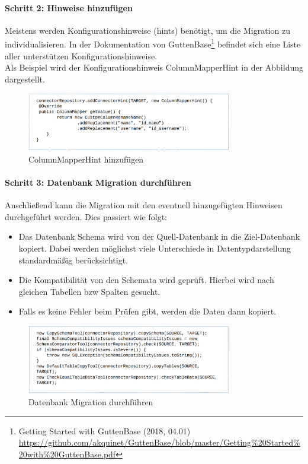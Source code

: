\paragraph*{Schritt 2: Hinweise hinzufügen}
Meistens werden Konfigurationshinweise (hints) benötigt, um die Migration zu individualisieren. In der Dokumentation von GuttenBase\footnote{Getting Started with GuttenBase (2018, 04.01) \\ \url{https://github.com/akquinet/GuttenBase/blob/master/Getting\%20Started\%20with\%20GuttenBase.pdf}} befindet sich eine Liste aller unterstützen Konfigurationshinweise. \\
Als Beispiel wird der Konfigurationshinweis ColumnMapperHint in der Abbildung dargestellt.
\begin{figure}[H]
	\centering
	\includegraphics[width=0.8\textwidth]{images/gb/rename}
	\caption{ColumnMapperHint hinzufügen}
	\label{img:gb/rename}
\end{figure}


\paragraph*{Schritt 3: Datenbank Migration durchführen}
Anschließend kann die Migration mit den eventuell hinzugefügten Hinweisen durchgeführt werden. Dies passiert wie folgt:
\begin{itemize}
	\item Das Datenbank Schema wird von der Quell-Datenbank in die Ziel-Datenbank kopiert. Dabei werden möglichst viele Unterschiede in Datentypdarstellung standardmäßig berücksichtigt.
	\item Die Kompatibilität von den Schemata wird geprüft. Hierbei wird nach gleichen Tabellen bzw Spalten gesucht.
	\item Falls es keine Fehler beim Prüfen gibt, werden die Daten dann kopiert.
\end{itemize}
\begin{figure}[H]
	\centering
	\includegraphics[width=0.8\textwidth]{images/gb/copy}
	\caption{Datenbank Migration durchführen}
	\label{img:gb/copy}
\end{figure}



